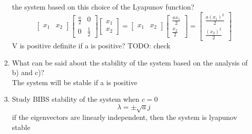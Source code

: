 \begin{enumerate}
    the system based on this choice of the Lyapunov function? \\
    \begin{equation}
      \begin{bmatrix}
        x_1 & x_2
      \end{bmatrix}
      \begin{bmatrix}
        \frac a 2 & 0 \\
        0 & \frac 1 2
      \end{bmatrix}
      \begin{bmatrix}
        x_1 \\
        x_2
      \end{bmatrix}=
      \begin{bmatrix}
        x_1 & x_2
      \end{bmatrix}
      \begin{bmatrix}
        \frac {ax_1} 2\\
        \frac {x_2} 2
      \end{bmatrix} = 
      \begin{bmatrix}
        \frac {a(x_1)^2} 2\\
        \frac {(x_2)^2} 2
      \end{bmatrix} 
    \end{equation}
    V is positive definite if a is positive?
    {\LARGE \color{red} TODO: check}
  \item What can be said about the stability of the system based on the analysis of b) and c)? \\
    The system will be stable if a is positive
  \item Study BIBS stability of the system when $c=0$ \\
    \begin{equation}
      \lambda = \pm \sqrt{a}j
    \end{equation}
    if the eigenvectors are linearly independent, then the system is lyapunov stable
  \end{enumerate}